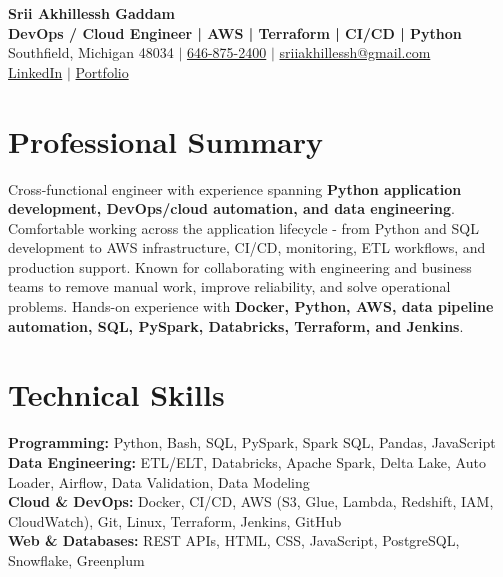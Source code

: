 \documentclass[letterpaper,10pt]{article}
\begin{document}
\fontsize{9.35pt}{10.45pt}\selectfont

\begin{center}
    {\LARGE \textbf{Srii Akhillessh Gaddam}} \\[-1pt]
    \textbf{DevOps / Cloud Engineer | AWS | Terraform | CI/CD | Python} \\[2pt]
    Southfield, Michigan 48034 $|$
    \href{tel:6468752400}{646-875-2400} $|$
    \href{mailto:sriiakhillessh@gmail.com}{sriiakhillessh@gmail.com} \\[1pt]
    \href{https://www.linkedin.com/in/srii-akhiilessh-gaddam-b48668191/}{LinkedIn} $|$
    \href{https://sriiakhillesshg.github.io/portfolio/}{Portfolio}
\end{center}
\vspace{-8pt}

\section{Professional Summary}
\small{Cross-functional engineer with experience spanning \textbf{Python application development, DevOps/cloud automation, and data engineering}. Comfortable working across the application lifecycle - from Python and SQL development to AWS infrastructure, CI/CD, monitoring, ETL workflows, and production support. Known for collaborating with engineering and business teams to remove manual work, improve reliability, and solve operational problems. Hands-on experience with \textbf{Docker, Python, AWS, data pipeline automation, SQL, PySpark, Databricks, Terraform, and Jenkins}.}

\section{Technical Skills}
\small{
\textbf{Programming:} Python, Bash, SQL, PySpark, Spark SQL, Pandas, JavaScript \\
\textbf{Data Engineering:} ETL/ELT, Databricks, Apache Spark, Delta Lake, Auto Loader, Airflow, Data Validation, Data Modeling \\
\textbf{Cloud \& DevOps:} Docker, CI/CD, AWS (S3, Glue, Lambda, Redshift, IAM, CloudWatch), Git, Linux, Terraform, Jenkins, GitHub \\
\textbf{Web \& Databases:} REST APIs, HTML, CSS, JavaScript, PostgreSQL, Snowflake, Greenplum
}
\end{document}
